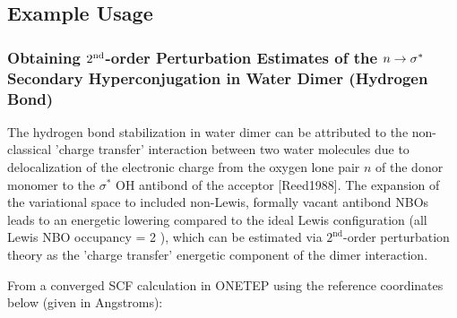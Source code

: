 \documentclass[letterpaper,10pt,english]{sphinxmanual}
\begin{document}
\subsection{Example Usage}
\label{\detokenize{nbo_onetep:example-usage}}

\subsubsection{Obtaining \protect\(2^{\mathrm{nd}}\protect\)-order Perturbation Estimates of the \protect\(n\rightarrow\sigma^*\protect\) Secondary Hyperconjugation in Water Dimer (Hydrogen Bond)}
\label{\detokenize{nbo_onetep:obtaining-order-perturbation-estimates-of-the-secondary-hyperconjugation-in-water-dimer-hydrogen-bond}}
The hydrogen bond stabilization in water dimer can be attributed to the
non-classical ’charge transfer’ interaction between two water molecules
due to delocalization of the electronic charge from the oxygen lone pair
\(n\) of the donor monomer to the \(\sigma^*\) O\textendash{}H antibond of
the acceptor {[}Reed1988{]}. The expansion
of the variational space to included non-Lewis, formally vacant antibond
NBOs leads to an energetic lowering compared to the ideal Lewis
configuration (all Lewis NBO occupancy = 2 ), which can be estimated
via \(2^{\mathrm{nd}}\)-order perturbation theory as the ’charge
transfer’ energetic component of the dimer interaction.

From a converged SCF calculation in ONETEP using the reference
coordinates below (given in Angstroms):
\begin{quote}

%
\begin{sphinxVerbatim}[commandchars=\\\{\}]
  
     
     
    
     
    
     
  
\end{sphinxVerbatim}
\end{quote}
\end{document}
